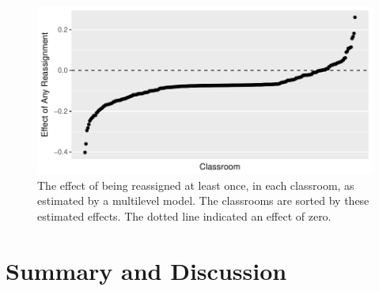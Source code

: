 \documentclass[12pt]{article}\usepackage[]{graphicx}\usepackage[]{color}
\makeatletter
\def\maxwidth{ %
  \ifdim\Gin@nat@width>\linewidth
    \linewidth
  \else
    \Gin@nat@width
  \fi
}
\makeatother
\begin{document}
\begin{figure}
  \centering

\includegraphics[width=\maxwidth]{figure/hetroPlot-1} 

\caption{The effect of being reassigned at least once, in each
  classroom, as estimated by a multilevel model. The classrooms are
  sorted by these estimated effects. The dotted line indicated an
  effect of zero.}
\label{fig:trtHet}
\end{figure}




\section{Summary and Discussion}\label{sec:discussion}
\end{document}

